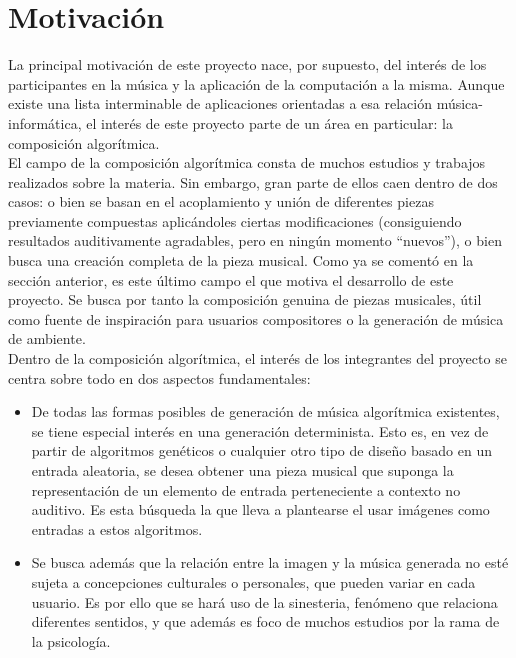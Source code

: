 \section{Motivación}
\label{sec:motivacion}


La principal motivación de este proyecto nace, por supuesto, del interés de los participantes en la música y la aplicación de la computación a la misma. Aunque existe una lista interminable de aplicaciones orientadas a esa relación música-informática, el interés de este proyecto parte de un área en particular: la composición algorítmica.\\

El campo de la composición algorítmica consta de muchos estudios y trabajos realizados sobre la materia. Sin embargo, gran parte de ellos caen dentro de dos casos: o bien se basan en el acoplamiento y unión de diferentes piezas previamente compuestas aplicándoles ciertas modificaciones (consiguiendo resultados auditivamente agradables, pero en ningún momento ``nuevos''), o bien busca una creación completa de la pieza musical. Como ya se comentó en la sección anterior, es este último campo el que motiva el desarrollo de este proyecto. Se busca por tanto la composición genuina de piezas musicales, útil como fuente de inspiración para usuarios compositores o la generación de música de ambiente.\\

Dentro de la composición algorítmica, el interés de los integrantes del proyecto se centra sobre todo en dos aspectos fundamentales:

\begin{itemize}

	\item De todas las formas posibles de generación de música algorítmica existentes, se tiene especial interés en una generación determinista. Esto es, en vez de partir de algoritmos genéticos o cualquier otro tipo de diseño basado en un entrada aleatoria, se desea obtener una pieza musical que suponga la representación de un elemento de entrada perteneciente a contexto no auditivo. Es esta búsqueda la que lleva a plantearse el usar imágenes como entradas a estos algoritmos.
	
	\item  Se busca además que la relación entre la imagen y la música generada no esté sujeta a concepciones culturales o personales, que pueden variar en cada usuario. Es por ello que se hará uso de la sinesteria, fenómeno que relaciona diferentes sentidos, y que además es foco de muchos estudios por la rama de la psicología.
	
\end{itemize}

